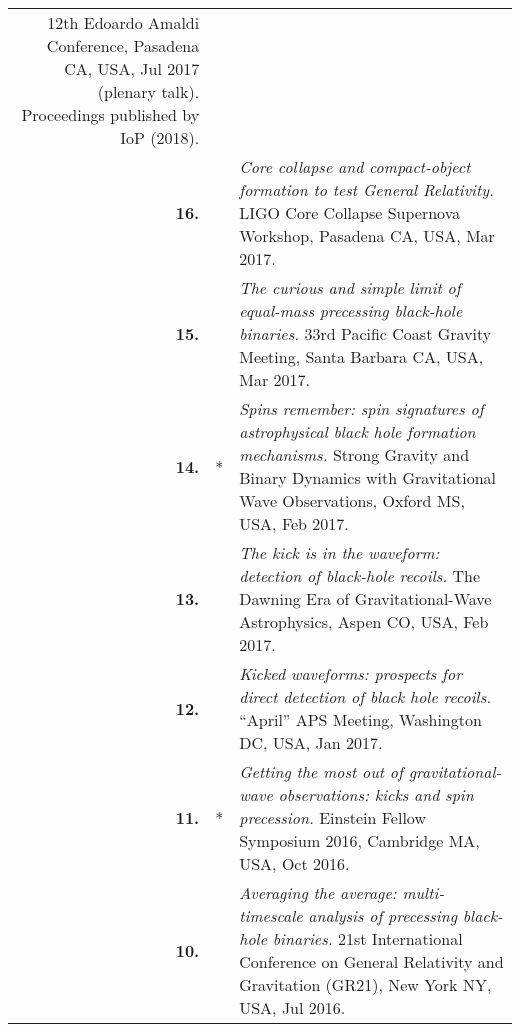 \documentclass[11pt,letterpaper,sans]{moderncv}   %
\begin{document}
{\begin{longtable}{rp{0.4cm}p{15.8cm}}
\newline{}12th Edoardo Amaldi Conference, Pasadena CA, USA, Jul 2017 (plenary talk).
\newline{}Proceedings published by IoP (2018).
\vspace{0.05cm}\\
%
\textbf{16.} & & \textit{Core collapse and compact-object formation to test General Relativity.}
\newline{}LIGO Core Collapse Supernova Workshop, Pasadena CA, USA, Mar 2017.
\vspace{0.05cm}\\
%
\textbf{15.} & & \textit{The curious and simple limit of equal-mass precessing black-hole binaries.}
\newline{}33rd Pacific Coast Gravity Meeting, Santa Barbara CA, USA, Mar 2017.
\vspace{0.05cm}\\
%
\textbf{14.} & * & \textit{Spins remember: spin signatures of astrophysical black hole formation mechanisms.}
\newline{}Strong Gravity and Binary Dynamics with Gravitational Wave Observations, Oxford MS, USA, Feb 2017.
\vspace{0.05cm}\\
%
\textbf{13.} & & \textit{The kick is in the waveform: detection of black-hole recoils.}
\newline{}The Dawning Era of Gravitational-Wave Astrophysics, Aspen CO, USA, Feb 2017.
\vspace{0.05cm}\\
%
\textbf{12.} & & \textit{Kicked waveforms: prospects for direct detection of black hole recoils.}
\newline{}``April'' APS Meeting, Washington DC, USA, Jan 2017.
\vspace{0.05cm}\\
%
\textbf{11.} & * & \textit{Getting the most out of gravitational-wave observations: kicks and spin precession.}
\newline{}Einstein Fellow Symposium 2016, Cambridge MA, USA, Oct 2016.
\vspace{0.05cm}\\
%
\textbf{10.} & & \textit{Averaging the average: multi-timescale analysis of precessing black-hole binaries.}
\newline{}21st International Conference on General Relativity and Gravitation (GR21), New York NY, USA, Jul 2016.
\vspace{0.05cm}\\

\end{longtable}}
\end{document}
